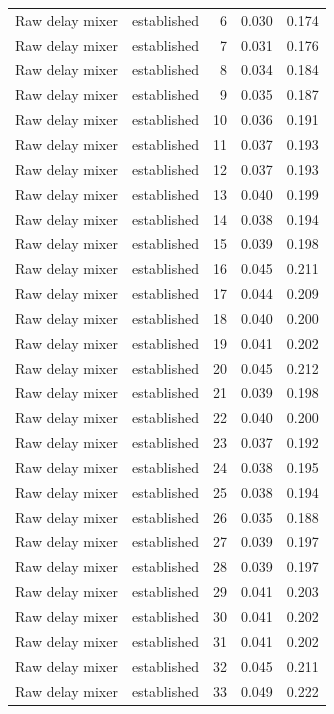\begin{tabular}{llrrr}
Raw delay mixer & established & 6 & 0.030 & 0.174 \\
Raw delay mixer & established & 7 & 0.031 & 0.176 \\
Raw delay mixer & established & 8 & 0.034 & 0.184 \\
Raw delay mixer & established & 9 & 0.035 & 0.187 \\
Raw delay mixer & established & 10 & 0.036 & 0.191 \\
Raw delay mixer & established & 11 & 0.037 & 0.193 \\
Raw delay mixer & established & 12 & 0.037 & 0.193 \\
Raw delay mixer & established & 13 & 0.040 & 0.199 \\
Raw delay mixer & established & 14 & 0.038 & 0.194 \\
Raw delay mixer & established & 15 & 0.039 & 0.198 \\
Raw delay mixer & established & 16 & 0.045 & 0.211 \\
Raw delay mixer & established & 17 & 0.044 & 0.209 \\
Raw delay mixer & established & 18 & 0.040 & 0.200 \\
Raw delay mixer & established & 19 & 0.041 & 0.202 \\
Raw delay mixer & established & 20 & 0.045 & 0.212 \\
Raw delay mixer & established & 21 & 0.039 & 0.198 \\
Raw delay mixer & established & 22 & 0.040 & 0.200 \\
Raw delay mixer & established & 23 & 0.037 & 0.192 \\
Raw delay mixer & established & 24 & 0.038 & 0.195 \\
Raw delay mixer & established & 25 & 0.038 & 0.194 \\
Raw delay mixer & established & 26 & 0.035 & 0.188 \\
Raw delay mixer & established & 27 & 0.039 & 0.197 \\
Raw delay mixer & established & 28 & 0.039 & 0.197 \\
Raw delay mixer & established & 29 & 0.041 & 0.203 \\
Raw delay mixer & established & 30 & 0.041 & 0.202 \\
Raw delay mixer & established & 31 & 0.041 & 0.202 \\
Raw delay mixer & established & 32 & 0.045 & 0.211 \\
Raw delay mixer & established & 33 & 0.049 & 0.222 \\

\end{tabular}
